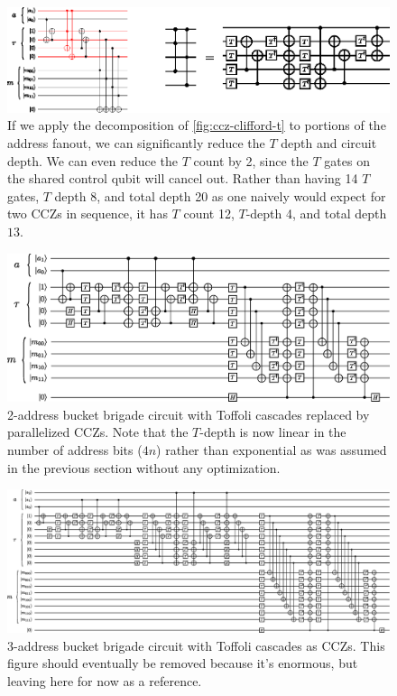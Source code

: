 \documentclass[a4paper,12pt]{article}
\begin{document}
\begin{figure}
 \centering
 \includegraphics[scale=1.5]{images/ccz-simplification}
 \caption{If we apply the decomposition of \autoref{fig:ccz-clifford-t} to portions of the address fanout, we can significantly reduce the $T$ depth and circuit depth. We can even reduce the $T$ count by 2, since the $T$ gates on the shared control qubit will cancel out. Rather than having 14 $T$ gates, $T$ depth 8, and total depth 20 as one naively would expect for two CCZs in sequence, it has $T$ count 12, $T$-depth 4, and total depth $13$.}
 \label{fig:ccz}
\end{figure}

\begin{figure}
 \includegraphics[scale=0.8]{images/bb_2address_ccz_full}
 \caption{2-address bucket brigade circuit with Toffoli cascades replaced by parallelized CCZs. Note that the $T$-depth is now linear in the number of address bits ($4n$) rather than exponential as was assumed in the previous section without any optimization.}
 \label{fig:bb_2address_ccz_full}
\end{figure}

\begin{figure}
 \includegraphics[scale=0.5]{images/bb_3address_ccz_full}
 \caption{3-address bucket brigade circuit with Toffoli cascades as CCZs. This figure should eventually be removed because it's enormous, but leaving here for now as a reference.}
 \label{fig:bb_3address_ccz_full}
\end{figure}
\end{document}
